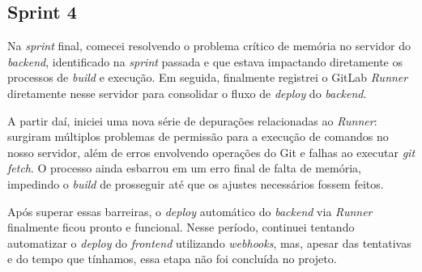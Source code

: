 \subsection{Sprint 4}

Na \textit{sprint} final, comecei resolvendo o problema crítico de memória no servidor do \textit{backend}, identificado na \textit{sprint} passada e que estava impactando diretamente os processos de \textit{build} e execução. Em seguida, finalmente registrei o GitLab \textit{Runner} diretamente nesse servidor para consolidar o fluxo de \textit{deploy} do \textit{backend}.

A partir daí, iniciei uma nova série de depurações relacionadas ao \textit{Runner}: surgiram múltiplos problemas de permissão para a execução de comandos no nosso servidor, além de erros envolvendo operações do Git e falhas ao executar \textit{git fetch}. O processo ainda esbarrou em um erro final de falta de memória, impedindo o \textit{build} de prosseguir até que os ajustes necessários fossem feitos.

Após superar essas barreiras, o \textit{deploy} automático do \textit{backend} via \textit{Runner} finalmente ficou pronto e funcional. Nesse período, continuei tentando automatizar o \textit{deploy} do \textit{frontend} utilizando \textit{webhooks}, mas, apesar das tentativas e do tempo que tínhamos, essa etapa não foi concluída no projeto.
\\

\noindent{}
